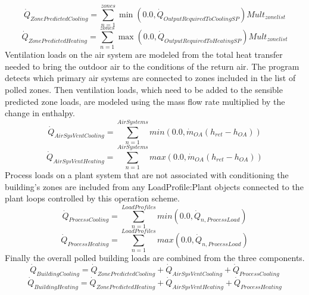 \begin{equation}
\dot Q_{ZonePredictedCooling}  = \sum_{n=1}^{zones} \min({0.0, \dot Q_{OutputRequiredToCoolingSP}}) {Mult_{zonelist}}
\end{equation}
\begin{equation}
\dot Q_{ZonePredictedHeating}  = \sum_{n=1}^{zones} \max({0.0, \dot Q_{OutputRequiredToHeatingSP}}) {Mult_{zonelist}}
\end{equation}
Ventilation loads on the air system are modeled from the total heat transfer needed to bring the outdoor air to the conditions of the return air. The program detects which primary air systems are connected to zones included in the list of polled zones.  Then ventilation loads, which need to be added to the sensible predicted zone loads, are modeled using the mass flow rate multiplied by the change in enthalpy.
\begin{equation}
\dot Q_{AirSysVentCooling} = \sum_{n=1}^{AirSystems} min(0.0, {\dot m_{OA}} ( {h_{ret}}  - {h_{OA}}))
\end{equation}
\begin{equation}
\dot Q_{AirSysVentHeating} = \sum_{n=1}^{AirSystems} max(0.0, {\dot m_{OA}} ( {h_{ret}}  - {h_{OA}}))
\end{equation}
Process loads on a plant system that are not associated with conditioning the building's zones are included from any LoadProfile:Plant objects connected to the plant loops controlled by this operation scheme.
\begin{equation}
\dot Q_{ProcessCooling} = \sum_{n=1}^{LoadProfiles} min({0.0, \dot Q_{n,ProcessLoad}})
\end{equation}
\begin{equation}
\dot Q_{ProcessHeating} = \sum_{n=1}^{LoadProfiles} max({0.0, \dot Q_{n,ProcessLoad}})
\end{equation}
Finally the overall polled building loads are combined from the three components.
\begin{equation}
\dot Q_{BuildingCooling} = \dot Q_{ZonePredictedCooling} +  \dot Q_{AirSysVentCooling}  + \dot Q_{ProcessCooling}
\end{equation}
\begin{equation}
\dot Q_{BuildingHeating} = \dot Q_{ZonePredictedHeating} +  \dot Q_{AirSysVentHeating}  + \dot Q_{ProcessHeating}
\end{equation}


